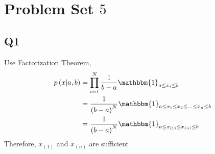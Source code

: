 \documentclass{article}
\begin{document}
\section{Problem Set $5$} 


\subsection{Q1}
Use Factorization Theorem,
\begin{align*}
p\left(x | a, b\right)  &= \displaystyle\prod_{i=1}^{N} \dfrac{1}{b - a} \mathbbm{1}_{a \leq  x_{i} \leq  b}
\\ &= \dfrac{1}{\left(b - a\right)^{N}} \mathbbm{1}_{a \leq  x_{1} \leq  x_{2} \leq  ... \leq  x_{n} \leq  b}
\\ &= \dfrac{1}{\left(b - a\right)^{N}} \mathbbm{1}_{a \leq  x_{\left(1\right)} \leq  x_{\left(n\right)} \leq  b}
\end{align*}
Therefore, $x_{\left(1\right)}$ and $x_{\left(n\right)}$ are sufficient
\end{document}

